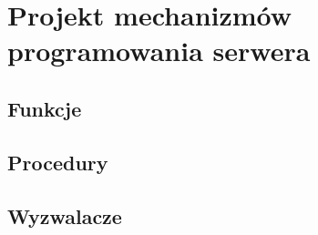 \documentclass[a4paper]{article}
\begin{document}
\section{Projekt mechanizmów programowania serwera}

\subsection{Funkcje}


\subsection{Procedury}


\subsection{Wyzwalacze}

\end{document}
